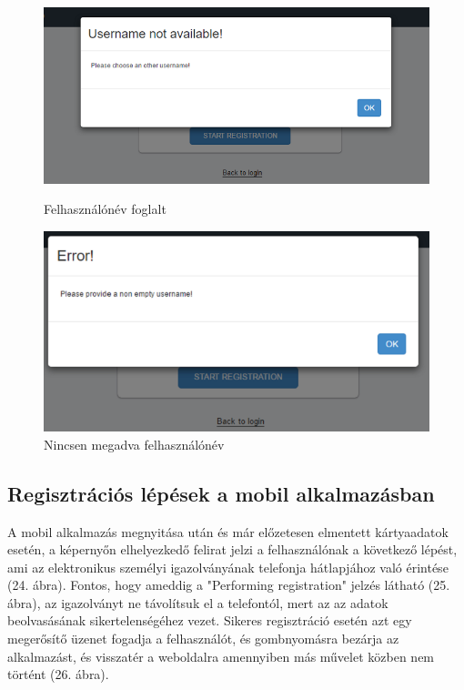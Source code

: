 \begin{figure}[h]
 \begin{minipage}{.50\textwidth} 
\centering
    \includegraphics[scale=0.40]{img/username_not_available}
    \caption{Felhasználónév foglalt}
 \end{minipage}
 \begin{minipage}{.50\textwidth} 
\centering
     \includegraphics[scale=0.40]{img/username_empty}
     \caption{Nincsen megadva felhasználónév}
 \end{minipage}
\end{figure}
\clearpage
\subsection{Regisztrációs lépések a mobil alkalmazásban}
A mobil alkalmazás megnyitása után és már előzetesen elmentett kártyaadatok esetén, a képernyőn elhelyezkedő felirat jelzi a felhasználónak a következő lépést, ami az elektronikus személyi igazolványának telefonja hátlapjához való érintése (24. ábra). Fontos, hogy ameddig a "Performing registration" jelzés látható (25. ábra), az igazolványt ne távolítsuk el a telefontól, mert az az adatok beolvasásának sikertelenségéhez vezet. Sikeres regisztráció esetén azt egy megerősítő üzenet fogadja a felhasználót, és gombnyomásra bezárja az alkalmazást, és visszatér a weboldalra amennyiben más művelet közben nem történt (26. ábra).

